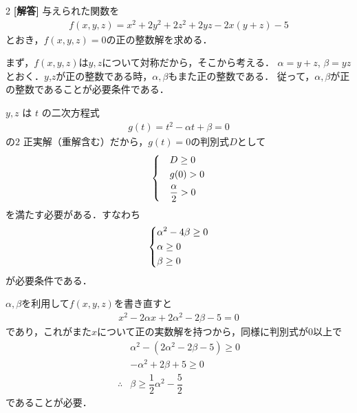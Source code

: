 \documentclass[../../main.tex]{subfiles}
\begin{document}
\setcounter{equation}{0}
\begin{oframed}
  
\end{oframed}
\setlength{\columnseprule}{0.4pt}
\begin{multicols}{2}
  {\bf [解答]}
  与えられた関数を
  \begin{align}
    f(x,y,z) = x^2+2y^2+2z^2+2yz-2x(y+z)-5
  \end{align}
  とおき，$f(x,y,z)=0$の正の整数解を求める．

  まず，$f(x,y,z)$は$y,z$について対称だから，そこから考える．
  $\alpha=y+z$, $\beta=yz$ とおく．$y$,$z$が正の整数である時，$\alpha,\beta$もまた正の整数である．
  従って，$\alpha,\beta$が正の整数であることが必要条件である．

  $y,z$ は $t$ の二次方程式
  \begin{align}
    g(t) = t^2-\alpha t+\beta=0
  \end{align}
  の$2$ 正実解（重解含む）だから，$g(t)=0$の判別式$D$として
  \begin{align}
    \begin{dcases}
      & D \ge 0              \\
      & g(0) > 0             \\
      & \dfrac{\alpha}{2} > 0
    \end{dcases}
  \end{align}
  を満たす必要がある．すなわち
  \begin{align}
    \begin{dcases}
      \alpha^2-4\beta \ge 0 \\
      \alpha \ge 0          \\
      \beta \ge 0
    \end{dcases} \label{eq:1}
  \end{align}
  が必要条件である．

  $\alpha,\beta$を利用して$f(x,y,z)$を書き直すと
  \begin{align}
    x^2-2\alpha x+2\alpha^2-2\beta-5=0 \label{eq:2}
  \end{align}
  であり，これがまた$x$について正の実数解を持つから，同様に判別式が$0$以上で
  \begin{align}
    & \alpha^2-(2\alpha^2-2\beta-5) \ge 0                           \\
    & -\alpha^2+2\beta+5 \ge 0                                      \\
    \therefore
    & \beta \ge \dfrac{1}{2}\alpha^2-\dfrac{5}{2} \label{eq:3}
  \end{align}
  であることが必要．


\end{multicols}
\end{document}
